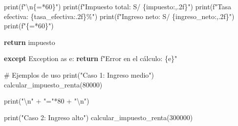 \documentclass[
  doc,
  floatsintext,
  longtable,
  a4paper,
  nolmodern,
  notxfonts,
  notimes,
  12pt,
  colorlinks=true,linkcolor=blue,citecolor=blue,urlcolor=blue]{apa7}
\newenvironment{Shaded}{\begin{snugshade}}{\end{snugshade}}
\newcommand{\BuiltInTok}[1]{\textcolor[rgb]{0.00,0.23,0.31}{#1}}
\newcommand{\CharTok}[1]{\textcolor[rgb]{0.13,0.47,0.30}{#1}}
\newcommand{\CommentTok}[1]{\textcolor[rgb]{0.37,0.37,0.37}{#1}}
\newcommand{\ControlFlowTok}[1]{\textcolor[rgb]{0.00,0.23,0.31}{\textbf{#1}}}
\newcommand{\DecValTok}[1]{\textcolor[rgb]{0.68,0.00,0.00}{#1}}
\newcommand{\ImportTok}[1]{\textcolor[rgb]{0.00,0.46,0.62}{#1}}
\newcommand{\NormalTok}[1]{\textcolor[rgb]{0.00,0.23,0.31}{#1}}
\newcommand{\OperatorTok}[1]{\textcolor[rgb]{0.37,0.37,0.37}{#1}}
\newcommand{\PreprocessorTok}[1]{\textcolor[rgb]{0.68,0.00,0.00}{#1}}
\newcommand{\SpecialCharTok}[1]{\textcolor[rgb]{0.37,0.37,0.37}{#1}}
\newcommand{\SpecialStringTok}[1]{\textcolor[rgb]{0.13,0.47,0.30}{#1}}
\newcommand{\StringTok}[1]{\textcolor[rgb]{0.13,0.47,0.30}{#1}}
\begin{document}
\begin{Shaded}
\begin{Highlighting}[]
        \BuiltInTok{print}\NormalTok{(}\SpecialStringTok{f"}\CharTok{\textbackslash{}n}\SpecialCharTok{\{}\StringTok{\textquotesingle{}=\textquotesingle{}}\OperatorTok{*}\DecValTok{60}\SpecialCharTok{\}}\SpecialStringTok{"}\NormalTok{)}
        \BuiltInTok{print}\NormalTok{(}\SpecialStringTok{f"Impuesto total: S/ }\SpecialCharTok{\{}\NormalTok{impuesto}\SpecialCharTok{:,.2f\}}\SpecialStringTok{"}\NormalTok{)}
        \BuiltInTok{print}\NormalTok{(}\SpecialStringTok{f"Tasa efectiva: }\SpecialCharTok{\{}\NormalTok{tasa\_efectiva}\SpecialCharTok{:.2f\}}\SpecialStringTok{\%"}\NormalTok{)}
        \BuiltInTok{print}\NormalTok{(}\SpecialStringTok{f"Ingreso neto: S/ }\SpecialCharTok{\{}\NormalTok{ingreso\_neto}\SpecialCharTok{:,.2f\}}\SpecialStringTok{"}\NormalTok{)}
        \BuiltInTok{print}\NormalTok{(}\SpecialStringTok{f"}\SpecialCharTok{\{}\StringTok{\textquotesingle{}=\textquotesingle{}}\OperatorTok{*}\DecValTok{60}\SpecialCharTok{\}}\SpecialStringTok{"}\NormalTok{)}
        
        \ControlFlowTok{return}\NormalTok{ impuesto}
        
    \ControlFlowTok{except} \PreprocessorTok{Exception} \ImportTok{as}\NormalTok{ e:}
        \ControlFlowTok{return} \SpecialStringTok{f"Error en el cálculo: }\SpecialCharTok{\{}\NormalTok{e}\SpecialCharTok{\}}\SpecialStringTok{"}

\CommentTok{\# Ejemplos de uso}
\BuiltInTok{print}\NormalTok{(}\StringTok{"Caso 1: Ingreso medio"}\NormalTok{)}
\NormalTok{calcular\_impuesto\_renta(}\DecValTok{80000}\NormalTok{)}

\BuiltInTok{print}\NormalTok{(}\StringTok{"}\CharTok{\textbackslash{}n}\StringTok{"} \OperatorTok{+} \StringTok{"="}\OperatorTok{*}\DecValTok{80} \OperatorTok{+} \StringTok{"}\CharTok{\textbackslash{}n}\StringTok{"}\NormalTok{)}

\BuiltInTok{print}\NormalTok{(}\StringTok{"Caso 2: Ingreso alto"}\NormalTok{)}
\NormalTok{calcular\_impuesto\_renta(}\DecValTok{300000}\NormalTok{)}
\end{Highlighting}
\end{Shaded}
\end{document}
